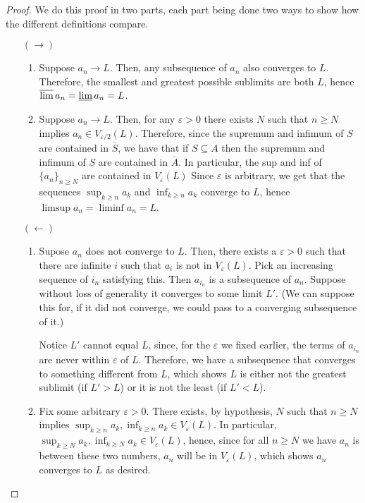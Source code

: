 \documentclass{article}
\theoremstyle{definition}
\begin{document}
	\begin{proof}
	We do this proof in two parts, each part being done two ways to show how the different definitions compare.
	
	\begin{enumerate}
	\item[$(\rightarrow)$]
	\begin{enumerate}
	\item Suppose $a_n \rightarrow L$. Then, any subsequence of $a_n$ also converges to $L$. Therefore, the smallest and greatest possible sublimits are both $L$, hence $\varlimsup a_n = \varliminf a_n = L$.
	
	\item Suppose $a_n \rightarrow L$. Then, for any $\varepsilon > 0$ there exists $N$ such that $n \geq N$ implies $a_n \in V_{\varepsilon/2} (L)$. Therefore, since the supremum and infimum of $S$ are contained in $\overline S$, we have that if $S \subseteq A$ then the supremum and infimum of $S$ are contained in $\overline A$. In particular, the sup and inf of $\{a_n\}_{n \geq N}$ are contained in $V_\varepsilon (L)$ Since $\varepsilon$ is arbitrary, we get that the sequences $\sup_{k \geq n} a_k$ and $\inf_{k \geq n} a_k$ converge to $L$, hence $\limsup a_n = \liminf a_n = L$.
	\end{enumerate}
	
	\item[$(\leftarrow)$]
	\begin{enumerate}
	\item Supose $a_n$ does not converge to $L$. Then, there exists a $\varepsilon > 0$ such that there are infinite $i$ such that $a_i$ is not in $V_\varepsilon(L)$. Pick an increasing sequence of $i_n$ satisfying this. Then $a_{i_n}$ is a subsequence of $a_n$. Suppose without loss of generality it converges to some limit $L'$. (We can suppose this for, if it did not converge, we could pass to a converging subsequence of it.)
	
	Notice $L'$ cannot equal $L$, since, for the $\varepsilon$ we fixed earlier, the terms of $a_{i_n}$ are never within $\varepsilon$ of $L$. Therefore, we have a subsequence that converges to something different from $L$, which shows $L$ is either not the greatest sublimit (if $L' > L$) or it is not the least (if $L' < L$).
	
	\item Fix some arbitrary $\varepsilon > 0$. There exists, by hypothesis, $N$ such that $n \geq N$ implies $\sup_{k \geq n} a_k, \inf_{k \geq n} a_k \in V_\varepsilon(L)$. In particular, $\sup_{k \geq N} a_k, \inf_{k \geq N} a_k \in V_\varepsilon(L)$, hence, since for all $n \geq N$ we have $a_n$ is between these two numbers, $a_n$ will be in $V_\varepsilon(L)$, which shows $a_n$ converges to $L$ as desired.
	\end{enumerate}
	\end{enumerate}
	\end{proof}
	
\end{document}
